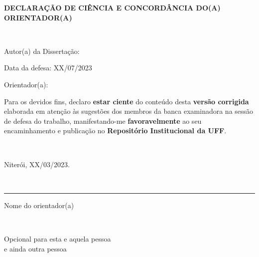 {
{\centering\textbf{DECLARAÇÃO DE CIÊNCIA E CONCORDÂNCIA DO(A) ORIENTADOR(A)}}

~\vspace{2cm}

Autor(a) da Dissertação: \AUTOR

Data da defesa: XX/07/2023

Orientador(a): \ORIENTADOR

\vspace{2cm}

Para os devidos fins, declaro \textbf{estar ciente} do conteúdo desta \textbf{versão corrigida} elaborada em atenção às sugestões  dos membros da banca examinadora na sessão de defesa do trabalho, manifestando-me \textbf{favoravelmente} ao seu encaminhamento e publicação no \textbf{Repositório Institucional da UFF}.

~\vspace{1cm}

{\raggedright Niterói, XX/03/2023.}

~\vspace{1cm}

\begin{center}
\begin{minipage}{200pt}
\centering
	\hrule

	Nome do orientador(a)
\end{minipage}
\end{center}


}

\clearpage

\thispagestyle{empty}

{

~\vspace{\fill}

\raggedleft
Opcional para esta e aquela pessoa\\
e ainda outra pessoa\\
}

\clearpage

\thispagestyle{empty}

